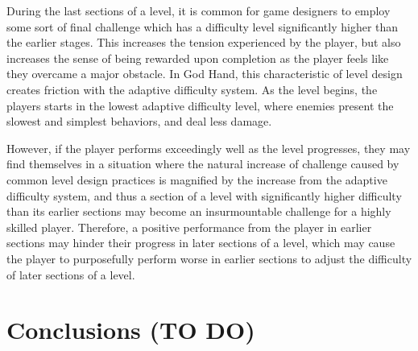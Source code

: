 During the last sections of a level, it is common for game designers to employ some sort of final challenge which has a difficulty level significantly higher than the earlier stages. This increases the tension experienced by the player, but also increases the sense of being rewarded upon completion as the player feels like they overcame a major obstacle. In God Hand, this characteristic of level design creates friction with the adaptive difficulty system. As the level begins, the players starts in the lowest adaptive difficulty level, where enemies present the slowest and simplest behaviors, and deal less damage.

However, if the player performs exceedingly well as the level progresses, they may find themselves in a situation where the natural increase of challenge caused by common level design practices is magnified by the increase from the adaptive difficulty system, and thus a section of a level with significantly higher difficulty than its earlier sections may become an insurmountable challenge for a highly skilled player. Therefore, a positive performance from the player in earlier sections may hinder their progress in later sections of a level, which may cause the player to purposefully perform worse in earlier sections to adjust the difficulty of later sections of a level.

\section{Conclusions (TO DO)}





